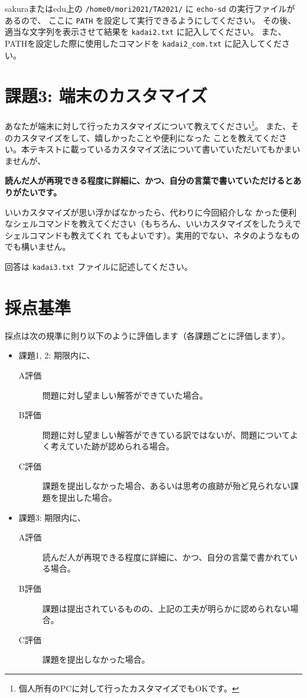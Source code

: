 \documentclass[a4j]{ltjreport}
\begin{document}
    sakuraまたはedu上の \verb+/home0/mori2021/TA2021/+ に \verb+echo-sd+ の実行ファイルがあるので、
    ここに \verb+PATH+ を設定して実行できるようにしてください。
    その後、適当な文字列を表示させて結果を \verb+kadai2.txt+ に記入してください。
    また、PATHを設定した際に使用したコマンドを \verb+kadai2_com.txt+ に記入してください。
    
    \pagebreak





    \section*{課題3: 端末のカスタマイズ}
    あなたが端末に対して行ったカスタマイズについて教えてください\footnote{個人所有のPCに対して行ったカスタマイズでもOKです。}。
    また、そのカスタマイズをして、嬉しかったことや便利になった
    ことを教えてください。本テキストに載っているカスタマイズ法について書いていただいてもかまいませんが、
    
    \textbf{読んだ人が再現できる程度に詳細に、かつ、自分の言葉で書いていただけるとありがたいです。}

    いいカスタマイズが思い浮かばなかったら、代わりに今回紹介しな
    かった便利なシェルコマンドを教えてください（もちろん、いいカスタマイズをしたうえでシェルコマンドも教えてくれ
    てもよいです）。実用的でない、ネタのようなものでも構いません。

    回答は \verb+kadai3.txt+ ファイルに記述してください。

    \section*{採点基準}
    採点は次の規準に則り以下のように評価します（各課題ごとに評価します）。
    \begin{itemize}
        \item 課題1, 2: 期限内に、
        \begin{description}
            \item[A評価] 問題に対し望ましい解答ができていた場合。
            \item[B評価] 問題に対し望ましい解答ができている訳ではないが、問題についてよく考えていた跡が認められる場合。
            \item[C評価] 課題を提出しなかった場合、あるいは思考の痕跡が殆ど見られない課題を提出した場合。
        \end{description}

        \item 課題3: 期限内に、
        \begin{description}
            \item[A評価] 読んだ人が再現できる程度に詳細に、かつ、自分の言葉で書かれている場合。
            \item[B評価] 課題は提出されているものの、上記の工夫が明らかに認められない場合。
            \item[C評価] 課題を提出しなかった場合。
        \end{description}
    \end{itemize}
\end{document}
